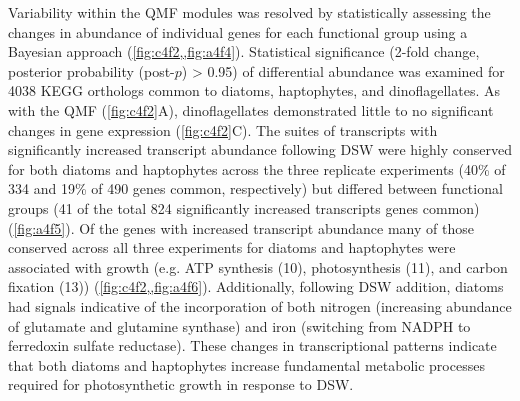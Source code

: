 Variability within the QMF modules was resolved by statistically assessing the changes in abundance of individual genes for each functional group using a Bayesian approach \citep{Wu2010} (\cref{fig:c4f2,,fig:a4f4}). Statistical significance (2-fold change, posterior probability (post-$p$) > 0.95) of differential abundance was examined for 4038 KEGG orthologs common to diatoms, haptophytes, and dinoflagellates. As with the QMF (\cref{fig:c4f2}A), dinoflagellates demonstrated little to no significant changes in gene expression (\cref{fig:c4f2}C). The suites of transcripts with significantly increased transcript abundance following DSW were highly conserved for both diatoms and haptophytes across the three replicate experiments (40\% of 334 and 19\% of 490 genes common, respectively) but differed between functional groups (41 of the total 824 significantly increased transcripts genes common) (\cref{fig:a4f5}). Of the genes with increased transcript abundance many of those conserved across all three experiments for diatoms and haptophytes were associated with growth (e.g. ATP synthesis (10), photosynthesis (11), and carbon fixation (13)) (\cref{fig:c4f2,,fig:a4f6}). Additionally, following DSW addition, diatoms had signals indicative of the incorporation of both nitrogen (increasing abundance of glutamate and glutamine synthase) and iron (switching from NADPH to ferredoxin sulfate reductase). These changes in transcriptional patterns indicate that both diatoms and haptophytes increase fundamental metabolic processes required for photosynthetic growth in response to DSW. \par
